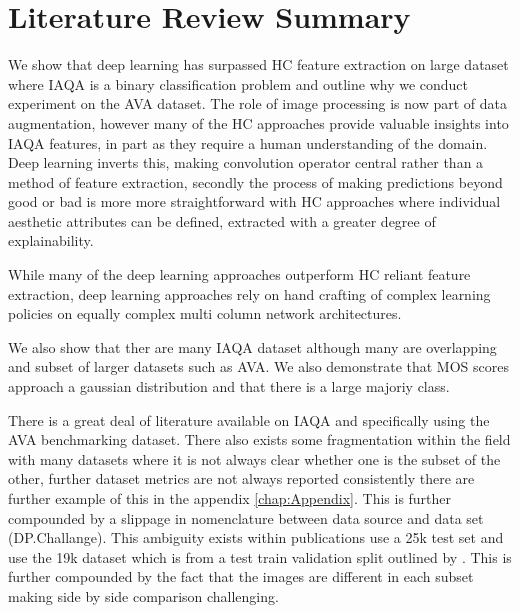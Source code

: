 \section{Literature Review Summary}



We show that deep learning has surpassed HC feature extraction on large dataset where IAQA is a binary classification problem and outline why we conduct experiment on the AVA dataset. The role of image processing is now part of data augmentation, however many of the HC approaches provide valuable insights into IAQA features, in part as they require a human understanding of the domain. Deep learning inverts this, making convolution operator central rather than a method of feature extraction, secondly the process of making predictions beyond good or bad is more more straightforward with HC approaches where individual aesthetic attributes can be defined, extracted with a greater degree of explainability. 

While many of the deep learning approaches outperform HC reliant feature extraction, deep learning approaches rely on hand crafting of complex learning policies on equally complex multi column network architectures.


We also show that ther are many IAQA dataset although many are overlapping and subset of larger datasets such as AVA. We also demonstrate that MOS scores approach a gaussian distribution and that there is a large majoriy class.


There is a great deal of literature available on IAQA and specifically using the AVA benchmarking dataset. There also exists some fragmentation within the field with many datasets where it is not always clear whether one is the subset of the other, further dataset metrics are not always reported consistently there are further example of this in the appendix \ref{chap:Appendix}. This is further compounded by a slippage in nomenclature between data source and data set (DP.Challange). This ambiguity exists within publications \cite{Talebi2018} use a 25k test set and \cite{Hosu2019} use the 19k dataset which is from a test train validation split outlined by \cite{Murray2012}. This is further compounded by the fact that the images are different in each subset making side by side comparison challenging. 


